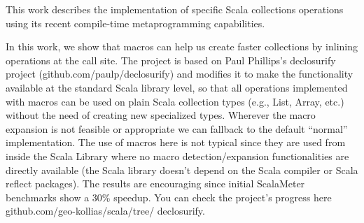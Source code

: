 This work describes the implementation of specific Scala collections operations
 using its recent compile-time metaprogramming capabilities.


In this work, we show that macros can help us create faster collections by
inlining operations at the call site. The project is based
on Paul Phillips's declosurify project (github.com/paulp/declosurify) and
modifies it to make the functionality available at the standard Scala library
level, so that all operations implemented with macros can be used on plain Scala
collection types (e.g., List, Array, etc.) without the need of creating new
specialized types. Wherever the macro expansion is not feasible or appropriate
we can fallback to the default ``normal'' implementation. The use of macros
here is not typical since they are used from inside the Scala Library where no
macro detection/expansion functionalities are directly available (the Scala
library doesn't depend on the Scala compiler or Scala reflect packages). The
results are encouraging since initial ScalaMeter benchmarks show a 30\% speedup.
You can check the project's progress here github.com/geo-kollias/scala/tree/
declosurify.
